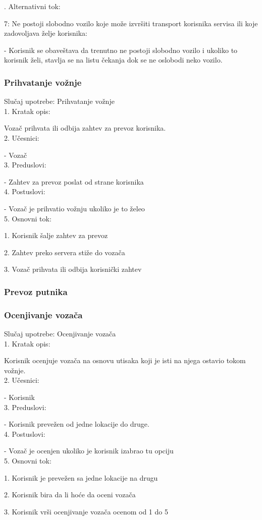 . Alternativni tok:
\par 7: Ne postoji slobodno vozilo koje može izvršiti transport korisnika servisa ili koje zadovoljava želje korisnika:
\par - Korisnik se obaveštava da trenutno ne postoji slobodno vozilo i ukoliko to korisnik želi, stavlja se na listu čekanja dok se ne oslobodi neko vozilo.

\subsubsection{\bfseries Prihvatanje vo\v znje}
\noindent Slučaj upotrebe: Prihvatanje vožnje \\
1. Kratak opis:
\par Vozač prihvata ili odbija zahtev za prevoz korisnika. \\
2.  Učesnici:  
\par - Vozač \\
3. Preduslovi: 
\par - Zahtev za prevoz poslat od strane korisnika \\
4. Postuslovi:
\par - Vozač je prihvatio vožnju ukoliko je to želeo \\
5. Osnovni tok:
\par 1. Korisnik šalje zahtev za prevoz
\par 2.  Zahtev preko servera stiže do vozača
\par 3.  Vozač prihvata ili odbija korisnički zahtev \\

\subsubsection{\bfseries Prevoz putnika}

\subsubsection{\bfseries Ocenjivanje voza\v ca}
\noindent Slučaj upotrebe: Ocenjivanje vozača \\
1. Kratak opis: 
\par Korisnik ocenjuje vozača na osnovu utisaka koji je isti na njega ostavio tokom vožnje. \\
2.  Učesnici:  
\par - Korisnik \\
3. Preduslovi: 
\par - Korisnik prevežen od jedne lokacije do druge. \\
4. Postuslovi:
\par - Vozač je ocenjen ukoliko je korisnik izabrao tu opciju \\
5. Osnovni tok:
\par 1. Korisnik je prevežen sa jedne lokacije na drugu
\par 2.  Korisnik bira da li hoće da oceni vozača
\par 3.  Korisnik vrši ocenjivanje vozača ocenom od 1 do 5 \\

